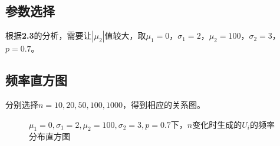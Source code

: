 \documentclass[CJK]{ctexart}
\begin{document}
\subsection{参数选择}

根据\textbf{2.3}的分析，需要让$|\mu_2|$值较大，取$\mu_1 = 0$，$ \sigma_1 = 2$，$ \mu_2 = 100$，$ \sigma_2 = 3$，$ p = 0.7$。

\subsection{频率直方图}

分别选择$n=10,20,50,100,1000$，得到相应的关系图。

\begin{figure}[H]
    \centering
    \quad
    \quad
    \quad
    \quad
    \caption{$\mu_1=0,\sigma_1=2,\mu_2=100,\sigma_2=3, p = 0.7$下，$n$变化时生成的$U_i$的频率分布直方图}
    \label{fig6}
\end{figure}
\end{document}
